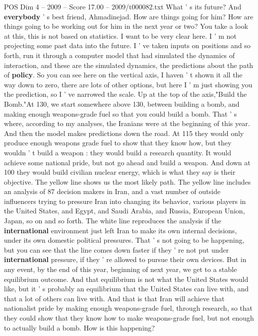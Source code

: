 \begin{textsample}{POS Dim 4 – 2009 – Score 17.00 – 2009/t000082.txt}
What ' s its future?
And \textbf{everybody} ' s best friend, Ahmadinejad.
How are things going for him?
How are things going to be working out for him in the next year or two?
You take a look at this, this is not based on statistics.
I want to be very clear here.
I ' m not projecting some past data into the future.
I ' ve taken inputs on positions and so forth, run it through a computer model that had simulated the dynamics of interaction, and these are the simulated dynamics, the predictions about the path of \textbf{policy}.
So you can see here on the vertical axis, I haven ' t shown it all the way down to zero, there are lots of other options, but here I ' m just showing you the prediction, so I ' ve narrowed the scale.
Up at the top of the axis,"Build the Bomb."At 130, we start somewhere above 130, between building a bomb, and making enough weapons-grade fuel so that you could build a bomb.
That ' s where, according to my analyses, the Iranians were at the beginning of this year.
And then the model makes predictions down the road.
At 115 they would only produce enough weapons grade fuel to show that they know how, but they wouldn ' t build a weapon : they would build a research quantity.
It would achieve some national pride, but not go ahead and build a weapon.
And down at 100 they would build civilian nuclear energy, which is what they say is their objective.
The yellow line shows us the most likely path.
The yellow line includes an analysis of 87 decision makers in Iran, and a vast number of outside influencers trying to pressure Iran into changing its behavior, various players in the United States, and Egypt, and Saudi Arabia, and Russia, European Union, Japan, so on and so forth.
The white line reproduces the analysis if the \textbf{international} environment just left Iran to make its own internal decisions, under its own domestic political pressures.
That ' s not going to be happening, but you can see that the line comes down faster if they ' re not put under \textbf{international} pressure, if they ' re allowed to pursue their own devices.
But in any event, by the end of this year, beginning of next year, we get to a stable equilibrium outcome.
And that equilibrium is not what the United States would like, but it ' s probably an equilibrium that the United States can live with, and that a lot of others can live with.
And that is that Iran will achieve that nationalist pride by making enough weapons-grade fuel, through research, so that they could show that they know how to make weapons-grade fuel, but not enough to actually build a bomb.
How is this happening?

\end{textsample}

